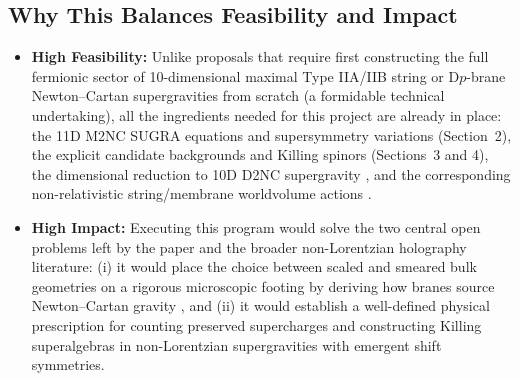 \documentclass[11pt]{article}
\begin{document}
\subsection*{Why This Balances Feasibility and Impact}
\begin{itemize}
    \item \textbf{High Feasibility:} Unlike proposals that require first constructing the full fermionic sector of 10-dimensional maximal Type IIA/IIB string or D$p$-brane Newton--Cartan supergravities from scratch (a formidable technical undertaking), all the ingredients needed for this project are already in place: the 11D M2NC SUGRA equations and supersymmetry variations (Section~2), the explicit candidate backgrounds and Killing spinors (Sections~3 and 4), the dimensional reduction to 10D D2NC supergravity \cite{Blair:2021waq}, and the corresponding non-relativistic string/membrane worldvolume actions \cite{Gomis:2023eav}.
    \item \textbf{High Impact:} Executing this program would solve the two central open problems left by the paper and the broader non-Lorentzian holography literature: (i) it would place the choice between scaled and smeared bulk geometries on a rigorous microscopic footing by deriving how branes source Newton--Cartan gravity \cite{Maskalaniec:2026,Lambert:2026}, and (ii) it would establish a well-defined physical prescription for counting preserved supercharges and constructing Killing superalgebras in non-Lorentzian supergravities with emergent shift symmetries.
\end{itemize}
\end{document}
